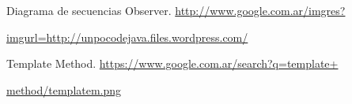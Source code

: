 \documentclass[12pt,a4paper]{report}
\begin{document}
\par [24] Diagrama de secuencias Observer. \url{http://www.google.com.ar/imgres?}
\par \hspace*{.7cm}\url{imgurl=http://unpocodejava.files.wordpress.com/}

\par [25] Template Method. \url{https://www.google.com.ar/search?q=template+}
\par \hspace*{.7cm}\url{method/templatem.png}
\appendix 
\addappheadtotoc
\appendixpage
\newpage







\end{document}
